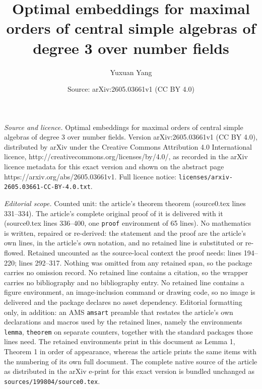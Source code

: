 \documentclass[10pt,a4paper]{amsart}
\title{Optimal embeddings for maximal orders of central simple algebras of degree 3 over number fields}
\author{Yuxuan Yang}
\date{Source: arXiv:2605.03661v1 (CC BY 4.0)}
\begin{document}
\maketitle

\noindent\emph{Source and licence.} Optimal embeddings for maximal orders of central simple algebras of degree 3 over number fields. Version arXiv:2605.03661v1 (CC BY 4.0), distributed by arXiv under the Creative Commons Attribution 4.0 International licence, http://creativecommons.org/licenses/by/4.0/, as recorded in the arXiv licence metadata for this exact version and shown on the abstract page https://arxiv.org/abs/2605.03661v1. Full licence notice: \texttt{licenses/arxiv-2605.03661-CC-BY-4.0.txt}.\par\smallskip

\noindent\textit{Editorial scope.} Counted unit: the article's theorem theorem (source0.tex lines 331--334). The article's complete original proof of it is delivered with it (source0.tex lines 336--400, one \texttt{proof} environment of 65 lines). No mathematics is written, repaired or re-derived: the statement and the proof are the article's own lines, in the article's own notation, and no retained line is substituted or re-flowed.  Retained uncounted as the source-local context the proof needs: lines 194--220; lines 292--317.  Nothing was omitted from any retained span, so the package carries no omission record.  No retained line contains a citation, so the wrapper carries no bibliography and no bibliography entry.  No retained line contains a figure environment, an image-inclusion command or drawing code, so no image is delivered and the package declares no asset dependency.  Editorial formatting only, in addition: an AMS \texttt{amsart} preamble that restates the article's own declarations and macros used by the retained lines, namely the environments \texttt{lemma}, \texttt{theorem} on separate counters, together with the standard packages those lines need.  The retained environments print in this document as Lemma 1, Theorem 1 in order of appearance, whereas the article prints the same items with the numbering of its own full document.  The complete native source of the article as distributed in the arXiv e-print for this exact version is bundled unchanged as \texttt{sources/199804/source0.tex}.
\end{document}
